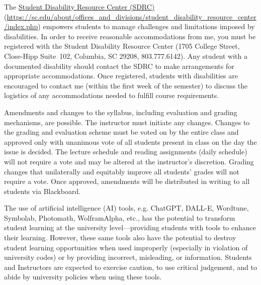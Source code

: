 \documentclass[11pt,letterpaper]{article}
\begin{document}

The \href{https://sc.edu/about/offices\_and\_divisions/student\_disability\_resource\_center/index.php}{Student Disability Resource Center (SDRC)} (\url{https://sc.edu/about/offices\_and\_divisions/student\_disability\_resource\_center/index.php}) empowers students to manage challenges and limitations imposed by disabilities. In order to receive reasonable accommodations from me, you must be registered with the Student Disability Resource Center (1705 College Street, Close-Hipp Suite~102, Columbia, SC 29208, 803.777.6142). Any student with a documented disability should contact the SDRC to make arrangements for appropriate accommodations. Once registered, students with disabilities are encouraged to contact me (within the first week of the semester) to discuss the logistics of any accommodations needed to fulfill course requirements. \sectionbreak




Amendments and changes to the syllabus, including evaluation and grading mechanisms, are possible. The instructor must initiate any changes. Changes to the grading and evaluation scheme must be voted on by the entire class and approved only with unanimous vote of all students present in class on the day the issue is decided. The lecture schedule and reading assignments (daily schedule) will not require a vote and may be altered at the instructor's discretion. Grading changes that unilaterally and equitably improve all students' grades will not require a vote. Once approved, amendments will be distributed in writing to all students via Blackboard. \sectionbreak




The use of artificial intelligence (AI) tools, e.g. ChatGPT, DALL-E, Wordtune, Symbolab, Photomath, WolframAlpha, etc., has the potential to transform student learning at the university level---providing students with tools to enhance their learning. However, these same tools also have the potential to destroy student learning opportunities when used improperly (especially in violation of university codes) or by providing incorrect, misleading, or information. Students and Instructors are expected to exercise caution, to use critical judgement, and to abide by university policies when using these tools. \pspace
\end{document}
